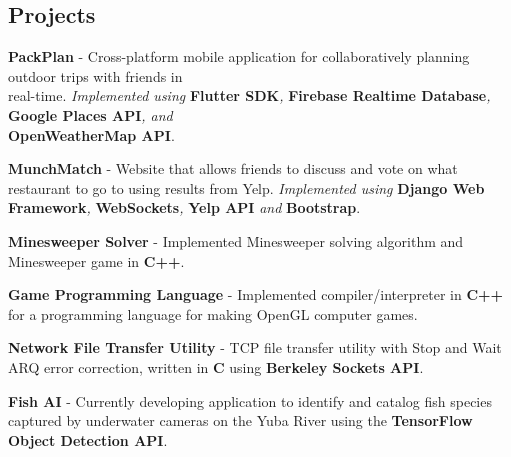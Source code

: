 \documentclass[letterpaper]{article}
\renewenvironment{itemize}{
  \begin{list}{}{
    \setlength{\leftmargin}{1.5em}
  }
}{
  \end{list}
}
\begin{document}
{\subsection*{Projects}
\begin{itemize}
    \item[$\bullet$] \textbf{PackPlan} - Cross-platform mobile application for collaboratively planning outdoor trips with friends in \\real-time. \emph{Implemented using }\textbf{Flutter SDK}\emph{, }\textbf{Firebase Realtime Database}\emph{, }\textbf{Google Places API}\emph{, and }\\\textbf{OpenWeatherMap API}.
    \item[$\bullet$] \textbf{MunchMatch} - Website that allows friends to discuss and vote on what restaurant to go to using results from Yelp. \emph{Implemented using }\textbf{Django Web Framework}\emph{, }\textbf{WebSockets}\emph{, }\textbf{Yelp API}\emph{ and }\textbf{Bootstrap}.
    \item[$\bullet$] \textbf{Minesweeper Solver} - Implemented Minesweeper solving algorithm and Minesweeper game in \textbf{C++}.
    \item[$\bullet$] \textbf{Game Programming Language} - Implemented compiler/interpreter in \textbf{C++} for a programming language for making OpenGL computer games.
    \item[$\bullet$] \textbf{Network File Transfer Utility} - TCP file transfer utility with Stop and Wait ARQ error correction, written in \textbf{C} using \textbf{Berkeley Sockets API}.
    \item[$\bullet$] \textbf{Fish AI} - Currently developing application to identify and catalog fish species captured by underwater cameras on the Yuba River using the \textbf{TensorFlow Object Detection API}.
\end{itemize}
\end{document}
